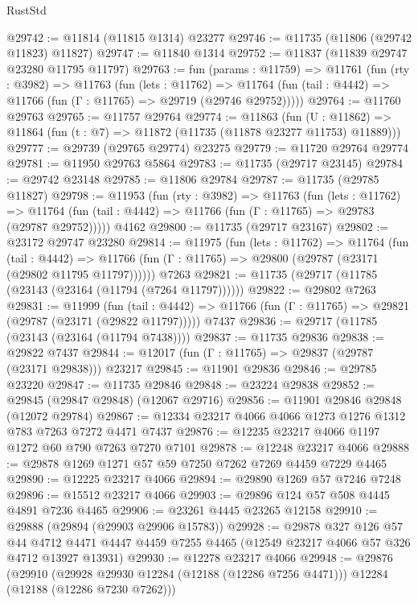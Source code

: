 \begin{lexlean}{RustStd}
\begin{coremodule}
@29742 := @11814 (@11815 @1314) @23277
@29746 := @11735 (@11806 (@29742 @11823) @11827)
@29747 := @11840 @1314
@29752 := @11837 (@11839 @29747 @23280 @11795 @11797)
@29763 := fun (params : @11759) =>
  @11761
    (fun (rty : @3982) =>
    @11763
      (fun (lets : @11762) =>
      @11764 (fun (tail : @4442) => @11766 (fun (Γ : @11765) => @29719 (@29746 @29752)))))
@29764 := @11760 @29763
@29765 := @11757 @29764
@29774 := @11863
    (fun (U : @11862) => @11864 (fun (t : @7) => @11872 (@11735 (@11878 @23277 @11753) @11889)))
@29777 := @29739 (@29765 @29774) @23275
@29779 := @11720 @29764 @29774
@29781 := @11950 @29763 @5864
@29783 := @11735 (@29717 @23145)
@29784 := @29742 @23148
@29785 := @11806 @29784
@29787 := @11735 (@29785 @11827)
@29798 := @11953
    (fun (rty : @3982) =>
    @11763
      (fun (lets : @11762) =>
      @11764 (fun (tail : @4442) => @11766 (fun (Γ : @11765) => @29783 (@29787 @29752)))))
    @4162
@29800 := @11735 (@29717 @23167)
@29802 := @23172 @29747 @23280
@29814 := @11975
    (fun (lets : @11762) =>
    @11764
      (fun (tail : @4442) =>
      @11766 (fun (Γ : @11765) => @29800 (@29787 (@23171 (@29802 @11795 @11797))))))
    @7263
@29821 := @11735 (@29717 (@11785 (@23143 (@23164 (@11794 (@7264 @11797))))))
@29822 := @29802 @7263
@29831 := @11999
    (fun (tail : @4442) => @11766 (fun (Γ : @11765) => @29821 (@29787 (@23171 (@29822 @11797)))))
    @7437
@29836 := @29717 (@11785 (@23143 (@23164 (@11794 @7438))))
@29837 := @11735 @29836
@29838 := @29822 @7437
@29844 := @12017 (fun (Γ : @11765) => @29837 (@29787 (@23171 @29838))) @23217
@29845 := @11901 @29836
@29846 := @29785 @23220
@29847 := @11735 @29846
@29848 := @23224 @29838
@29852 := @29845 (@29847 @29848) (@12067 @29716)
@29856 := @11901 @29846 @29848 (@12072 @29784)
@29867 := @12334 @23217 @4066 @4066 @1273 @1276 @1312 @783 @7263 @7272 @4471 @7437
@29876 := @12235 @23217 @4066 @1197 @1272 @60 @790 @7263 @7270 @7101
@29878 := @12248 @23217 @4066
@29888 := @29878 @1269 @1271 @57 @59 @7250 @7262 @7269 @4459 @7229 @4465
@29890 := @12225 @23217 @4066
@29894 := @29890 @1269 @57 @7246 @7248
@29896 := @15512 @23217 @4066
@29903 := @29896 @124 @57 @508 @4445 @4891 @7236 @4465
@29906 := @23261 @4445 @23265 @12158
@29910 := @29888 (@29894 (@29903 @29906 @15783))
@29928 := @29878
    @327
    @126
    @57
    @44
    @4712
    @4471
    @4447
    @4459
    @7255
    @4465
    (@12549 @23217 @4066 @57 @326 @4712 @13927 @13931)
@29930 := @12278 @23217 @4066
@29948 := @29876
    (@29910
      (@29928 @29930 @12284 (@12188 (@12286 @7256 @4471)))
      @12284
      (@12188 (@12286 @7230 @7262)))

\end{coremodule}
\end{lexlean}
